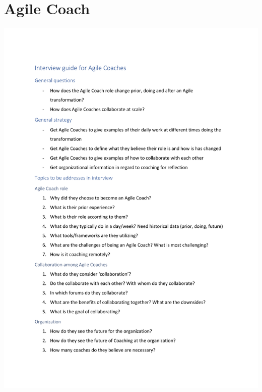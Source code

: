 \documentclass[11pt,a4paper]{report}
\begin{document}
\section{Agile Coach}
\includegraphics[scale=0.99, page=1]{acInterview.pdf}
\newpage
\end{document}
